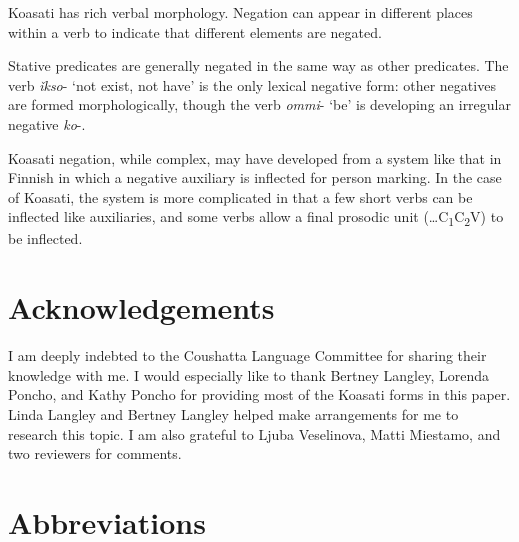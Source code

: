 \documentclass[output=paper,colorlinks,citecolor=brown]{langscibook}
\begin{document}
Koasati has rich verbal morphology. Negation can appear in different places within a verb to indicate that different elements are negated.

Stative predicates are generally negated in the same way as other predicates. The verb \textit{\v{i}kso}- ‘not exist, not have’ is the only lexical negative form: other negatives are formed morphologically, though the verb \textit{ommi}- ‘be’ is developing an irregular negative \textit{ko}-.

Koasati negation, while complex, may have developed from a system like that in Finnish in which a negative auxiliary is inflected for person marking. In the case of Koasati, the system is more complicated in that a few short verbs can be inflected like auxiliaries, and some verbs allow a final prosodic unit (…C\textsubscript{1}C\textsubscript{2}V) to be inflected.


\section*{Acknowledgements}

I am deeply indebted to the Coushatta Language Committee for sharing their knowledge with me. I would especially like to thank Bertney Langley, Lorenda Poncho, and Kathy Poncho for providing most of the Koasati forms in this paper. Linda Langley and Bertney Langley helped make arrangements for me to research this topic. I am also grateful to Ljuba Veselinova, Matti Miestamo, and two reviewers for comments.


\section*{Abbreviations}
\end{document}
